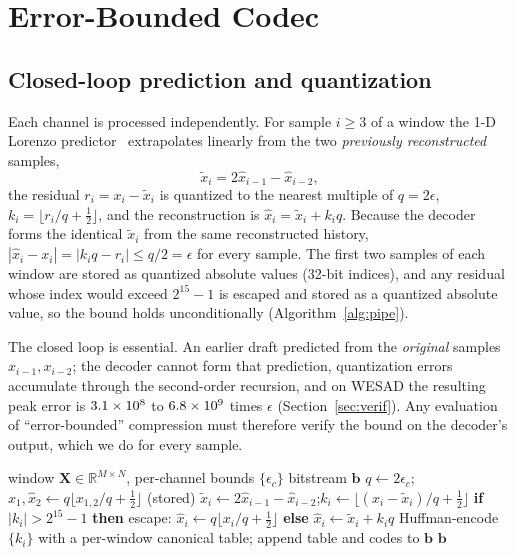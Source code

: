 \documentclass[journal]{IEEEtran}
\begin{document}
\section{Error-Bounded Codec}
\label{sec:codec}
\subsection{Closed-loop prediction and quantization}
Each channel is processed independently. For sample $i\ge3$ of a window the 1-D Lorenzo predictor~\cite{ibarria2003} extrapolates linearly from the two \emph{previously reconstructed} samples,
\begin{equation}
\tilde{x}_i = 2\hat{x}_{i-1}-\hat{x}_{i-2},
\label{eq:lorenzo}
\end{equation}
the residual $r_i=x_i-\tilde{x}_i$ is quantized to the nearest multiple of $q=2\epsilon$, $k_i=\lfloor r_i/q+\tfrac12\rfloor$, and the reconstruction is $\hat{x}_i=\tilde{x}_i+k_iq$. Because the decoder forms the identical $\tilde{x}_i$ from the same reconstructed history, $|\hat{x}_i-x_i|=|k_iq-r_i|\le q/2=\epsilon$ for every sample. The first two samples of each window are stored as quantized absolute values (32-bit indices), and any residual whose index would exceed $2^{15}-1$ is escaped and stored as a quantized absolute value, so the bound holds unconditionally (Algorithm~\ref{alg:pipe}).

The closed loop is essential. An earlier draft predicted from the \emph{original} samples $x_{i-1},x_{i-2}$; the decoder cannot form that prediction, quantization errors accumulate through the second-order recursion, and on WESAD the resulting peak error is $3.1\times10^{8}$ to $6.8\times10^{9}$ times $\epsilon$ (Section~\ref{sec:verif}). Any evaluation of ``error-bounded'' compression must therefore verify the bound on the decoder's output, which we do for every sample.

\begin{algorithm}[t]
\caption{On-device compression of one transmit window}
\label{alg:pipe}
\begin{algorithmic}[1]
\REQUIRE window $\mathbf{X}\in\mathbb{R}^{M\times N}$, per-channel bounds $\{\epsilon_c\}$
\ENSURE bitstream $\mathbf{b}$
  \STATE $q\leftarrow 2\epsilon_c$; \quad $\hat{x}_1,\hat{x}_2\leftarrow q\lfloor x_{1,2}/q+\tfrac12\rfloor$ (stored)
    \STATE $\tilde{x}_i\leftarrow 2\hat{x}_{i-1}-\hat{x}_{i-2}$;\quad $k_i\leftarrow\lfloor(x_i-\tilde{x}_i)/q+\tfrac12\rfloor$
    \STATE \textbf{if} $|k_i|>2^{15}-1$ \textbf{then} escape: $\hat{x}_i\leftarrow q\lfloor x_i/q+\tfrac12\rfloor$ \textbf{else} $\hat{x}_i\leftarrow\tilde{x}_i+k_iq$
  \ENDFOR
  \STATE Huffman-encode $\{k_i\}$ with a per-window canonical table; append table and codes to $\mathbf{b}$
\ENDFOR
\RETURN $\mathbf{b}$
\end{algorithmic}
\end{algorithm}
\end{document}
